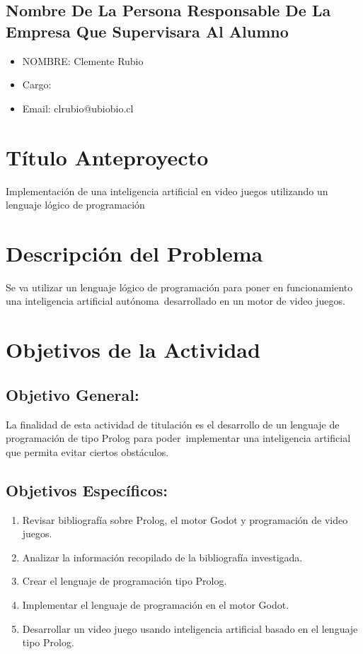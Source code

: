 \documentclass[spanish]{article}
\begin{document}
\subsection{Nombre De La Persona Responsable De La Empresa Que Supervisara Al Alumno}
	\begin{itemize}
		\item NOMBRE: Clemente Rubio
		\item Cargo:
		\item Email: clrubio@ubiobio.cl
	\end{itemize}

\section{Título Anteproyecto}

Implementación de una inteligencia artificial en video juegos utilizando un lenguaje lógico de programación

\section{Descripción del Problema}

Se va utilizar un lenguaje lógico de programación para poner en funcionamiento una inteligencia artificial autónoma\
desarrollado en un motor de video juegos.

\section{Objetivos de la Actividad}
\subsection{Objetivo General:}

La finalidad de esta actividad de titulación es el desarrollo de un lenguaje de programación de tipo Prolog para poder\
implementar una inteligencia artificial que permita evitar ciertos obstáculos.

\subsection{Objetivos Específicos:}

\begin{enumerate}
    \item Revisar bibliografía sobre Prolog, el motor Godot y programación de video juegos.
    \item Analizar la información recopilado de la bibliografía investigada.
    \item Crear el lenguaje de programación tipo Prolog.
    \item Implementar el lenguaje de programación en el motor Godot.
    \item Desarrollar un video juego usando inteligencia artificial basado en el lenguaje tipo Prolog.
\end{enumerate}
\end{document}
